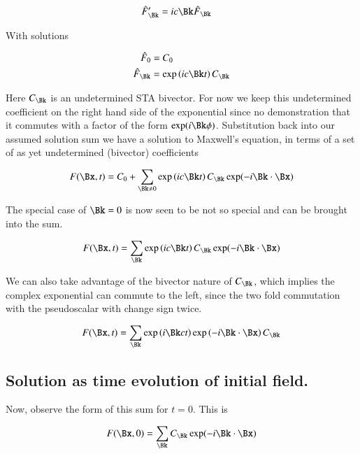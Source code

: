 \documentclass{article}
\begin{document}
\begin{align*}
\hat{F}_{\Bk}' &= i c \Bk \hat{F}_{\Bk}
\end{align*}

With solutions

\begin{align*}
\hat{F}_{0} &= C_{0} \\
\hat{F}_{\Bk} &= \exp\left(i c \Bk t \right) C_{\Bk} \\
\end{align*}

Here $C_{\Bk}$ is an undetermined STA bivector.  For now we keep this undetermined coefficient on the right hand side of the exponential since no demonstration that it commutes with a factor of the form $\exp(i\Bk\phi)$.  Substitution back into our assumed solution sum we have a solution to Maxwell's equation, in terms of a set of as yet undetermined (bivector) coefficients

\begin{align*}
F(\Bx,t) = C_0 + \sum_{\Bk \ne 0} \exp\left(i c \Bk t \right) C_{\Bk} \exp(-i \Bk \cdot \Bx )
\end{align*}

The special case of $\Bk = 0$ is now seen to be not so special and can be brought into the sum.  

\begin{align*}
F(\Bx,t) = \sum_{\Bk} \exp\left(i c \Bk t \right) C_{\Bk} \exp(-i \Bk \cdot \Bx )
\end{align*}

We can also 
take advantage of the bivector nature of $C_{\Bk}$, which implies the complex exponential can commute to the left, since the two fold commutation with the pseudoscalar with change sign twice.

\begin{align}\label{eqn:undetermined}
F(\Bx,t) = \sum_{\Bk} 
\exp\left(i \Bk c t \right) 
\exp\left(-i \Bk \cdot \Bx \right) 
C_{\Bk} 
\end{align}

\subsection{ Solution as time evolution of initial field. }

Now, observe the form of this sum for $t=0$.  This is

\begin{align*}
F(\Bx,0) 
&= \sum_{\Bk} C_{\Bk} \exp(-i \Bk \cdot \Bx ) \\
\end{align*}
\end{document}
